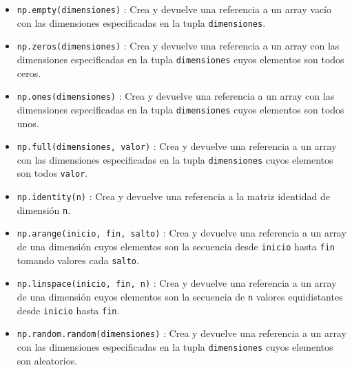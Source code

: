 \documentclass[
  spanish,
  a4paper,
]{scrreport}
\begin{document}
\begin{itemize}
\item
  \texttt{np.empty(dimensiones)} : Crea y devuelve una referencia a un
  array vacío con las dimensiones especificadas en la tupla
  \texttt{dimensiones}.
\item
  \texttt{np.zeros(dimensiones)} : Crea y devuelve una referencia a un
  array con las dimensiones especificadas en la tupla
  \texttt{dimensiones} cuyos elementos son todos ceros.
\item
  \texttt{np.ones(dimensiones)} : Crea y devuelve una referencia a un
  array con las dimensiones especificadas en la tupla
  \texttt{dimensiones} cuyos elementos son todos unos.
\item
  \texttt{np.full(dimensiones,\ valor)} : Crea y devuelve una referencia
  a un array con las dimensiones especificadas en la tupla
  \texttt{dimensiones} cuyos elementos son todos \texttt{valor}.
\item
  \texttt{np.identity(n)} : Crea y devuelve una referencia a la matriz
  identidad de dimensión \texttt{n}.
\item
  \texttt{np.arange(inicio,\ fin,\ salto)} : Crea y devuelve una
  referencia a un array de una dimensión cuyos elementos son la
  secuencia desde \texttt{inicio} hasta \texttt{fin} tomando valores
  cada \texttt{salto}.
\item
  \texttt{np.linspace(inicio,\ fin,\ n)} : Crea y devuelve una
  referencia a un array de una dimensión cuyos elementos son la
  secuencia de \texttt{n} valores equidistantes desde \texttt{inicio}
  hasta \texttt{fin}.
\item
  \texttt{np.random.random(dimensiones)} : Crea y devuelve una
  referencia a un array con las dimensiones especificadas en la tupla
  \texttt{dimensiones} cuyos elementos son aleatorios.
\end{itemize}
\end{document}
